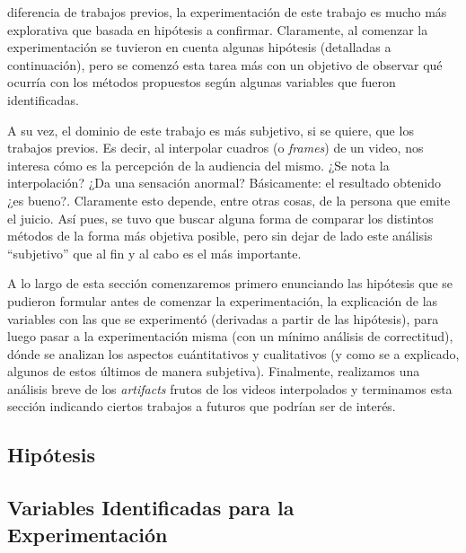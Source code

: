  diferencia de trabajos previos, la experimentaci\'on de este
trabajo es mucho m\'as explorativa que basada en hip\'otesis a confirmar.
Claramente, al comenzar la experimentaci\'on se tuvieron en cuenta algunas hip\'otesis
(detalladas a continuaci\'on), pero se comenz\'o esta tarea m\'as con un
objetivo de observar qué ocurría con los m\'etodos propuestos seg\'un algunas
variables que fueron identificadas.

\par A su vez, el dominio de este trabajo es m\'as subjetivo, si se quiere, que
los trabajos previos. Es decir, al interpolar cuadros (o \emph{frames}) de un
video, nos interesa cómo es la percepci\'on de la audiencia del mismo. ¿Se nota
la interpolaci\'on? ¿Da una sensaci\'on anormal?
B\'asicamente: el resultado obtenido ¿es bueno?. Claramente esto depende, entre otras cosas, de la persona que emite el juicio.
As\'i pues, se tuvo que buscar alguna forma de comparar los distintos m\'etodos
de la forma m\'as objetiva posible, pero sin dejar de lado este
an\'alisis ``subjetivo'' que al fin y al cabo es el m\'as importante.

\par A lo largo de esta secci\'on comenzaremos primero enunciando las
hip\'otesis que se pudieron formular antes de comenzar la experimentaci\'on, la
explicaci\'on de las variables con las que se experiment\'o (derivadas a partir
de las hip\'otesis), para luego pasar a la experimentaci\'on misma (con un
m\'inimo an\'alisis de correctitud), d\'onde se analizan los aspectos
cu\'antitativos y cualitativos (y como se a explicado, algunos de estos
\'ultimos de manera subjetiva).  Finalmente, realizamos una an\'alisis breve de
los \emph{artifacts} frutos de los videos interpolados y terminamos esta
secci\'on indicando ciertos trabajos a futuros que podr\'ian ser de inter\'es.

\subsection{Hip\'otesis}


\subsection{Variables Identificadas para la Experimentaci\'on}


